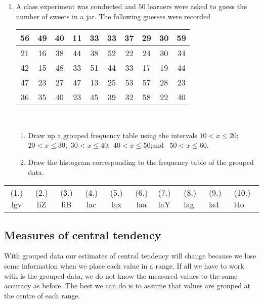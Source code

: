 \begin{exercises}{}{
  \begin{enumerate}[itemsep=5pt, label=\textbf{\arabic*}. ]
 \item  A class experiment was conducted and $50$ learners were asked to
  guess the number of sweets in a jar. The following guesses were
  recorded
\\
  \begin{center}
    \begin{tabular}{|c|c|c|c|c|c|c|c|c|c|} \hline
   
      56 & 49 & 40 & 11 & 33 & 33 & 37 & 29 & 30 & 59 \\ \hline
      21 & 16 & 38 & 44 & 38 & 52 & 22 & 24 & 30 & 34 \\\hline
      42 & 15 & 48 & 33 & 51 & 44 & 33 & 17 & 19 & 44 \\\hline
      47 & 23 & 27 & 47 & 13 & 25 & 53 & 57 & 28 & 23 \\\hline
      36 & 35 & 40 & 23 & 45 & 39 & 32 & 58 & 22 & 40 \\\hline

    \end{tabular}
  \end{center}
\vspace {8pt}\\
   \begin{enumerate}[noitemsep, label=\textbf{(\alph*)} ]
\item
 Draw up a grouped frequency table using the intervals
  $10 < x \le 20$;\ $20 < x \le 30$;\ $30 < x \le 40$;\ 
  $40 < x \le 50$;and \ $50 < x \le 60$.

  \item Draw the histogram corresponding to the frequency table of the
  grouped data.
\end{enumerate}
\end{enumerate}
\practiceinfo
\par 
\par \begin{tabular}[h]{cccccc}
(1.) lgv  &  (2.) liZ  &  (3.) liB  &  (4.) lac  &  (5.) lax  &  (6.) laa  &  (7.) laY  &  (8.) lag  &  (9.) la4  &  (10.) l4o  & \end{tabular}
}
\end{exercises}
% 
\subsection*{Measures of central tendency}
With grouped data our estimates of central tendency will change
because we lose some information when we place each value in a range.
If all we have to work with is the grouped data, we do not know the
measured values to the same accuracy as before. The best we can do is
to assume that values are grouped at the centre of each range.\par

